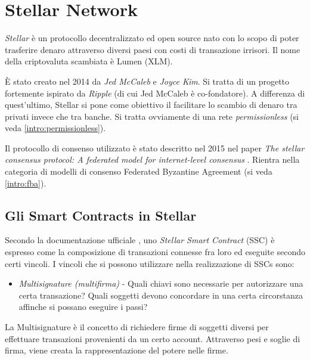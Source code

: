 \section{Stellar Network}

\textit{Stellar} è un protocollo decentralizzato ed
open source nato con lo scopo di poter
trasferire denaro attraverso diversi
paesi con costi di transazione irrisori. Il nome della criptovaluta scambiata
è Lumen (XLM).

È stato creato nel 2014 da \textit{Jed McCaleb} e \textit{Joyce Kim}.
Si tratta di un progetto fortemente ispirato da \textit{Ripple} (di cui Jed McCaleb
è co-fondatore). A differenza di quest'ultimo, Stellar si pone come obiettivo
il facilitare lo scambio di denaro tra privati invece che tra banche. Si tratta ovviamente di
una rete \textit{permissionless} (si veda \ref{intro:permissionless}).

Il protocollo di consenso utilizzato è stato descritto nel 2015 nel paper
\textit{The stellar consensus protocol: A federated model for internet-level consensus} \cite{mazieres2015stellar}.
Rientra nella categoria di modelli di consenso Federated Byzantine Agreement (si veda \ref{intro:fba}).


\subsection{Gli Smart Contracts in Stellar}
\label{subsec:stellar smart contracts}

Secondo la documentazione ufficiale \cite{stellar-doc-sc},
uno \textit{Stellar Smart Contract} (SSC) è espresso come la composizione
di transazioni connesse fra loro ed eseguite secondo certi vincoli.
I vincoli che si possono utilizzare nella realizzazione di SSCs sono:

\begin{itemize}
	\item \textit{Multisignature (multifirma)} - Quali chiavi sono necessarie
	      per autorizzare
	      una certa transazione? Quali soggetti devono concordare in una certa
	      circorstanza affinche si possano eseguire i passi?
\end{itemize}
La Multisignature è il concetto di richiedere firme di soggetti diversi per
effettuare transazioni provenienti da un certo account.
Attraverso pesi e soglie di firma,
viene creata la rappresentazione del potere nelle firme.

